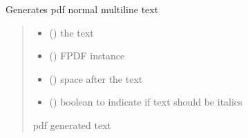 \documentclass[letterpaper,10pt,english]{sphinxmanual}
\begin{document}
\begin{fulllineitems}
\label{\detokenize{auxilary_functions:auxilary_functions.normal_text}}
\pysigstartsignatures
{}
\pysigstopsignatures
\sphinxAtStartPar
Generates pdf normal multi\sphinxhyphen{}line text
\begin{quote}\begin{description}
\begin{itemize}
\item {} 
\sphinxAtStartPar
{} () \textendash{} the text

\item {} 
\sphinxAtStartPar
{} () \textendash{} FPDF instance

\item {} 
\sphinxAtStartPar
{} () \textendash{} space after the text

\item {} 
\sphinxAtStartPar
{} () \textendash{} boolean to indicate if text should be italics

\end{itemize}

\sphinxAtStartPar
pdf generated text

\end{description}\end{quote}

\end{fulllineitems}

\end{document}
